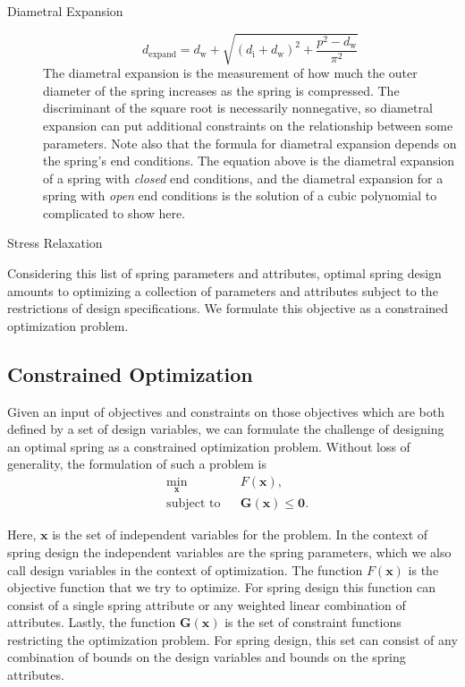 \documentclass[10pt]{article}
\begin{document}
\begin{description}
			\item[Diametral Expansion]\begin{equation} d_{\text{expand}} = d_{\text{w}} + \sqrt{(d_{\text{i}} + d_{\text{w}})^{2} + \frac{p^{2} - d_{\text{w}}}{\pi^{2}}}
			\end{equation}
				The diametral expansion is the measurement of how much the outer diameter of the spring increases as the spring is compressed. The discriminant of the square root is necessarily nonnegative, so diametral expansion can put additional constraints on the relationship between some parameters. Note also that the formula for diametral expansion depends on the spring's end conditions. The equation above is the diametral expansion of a spring with \textit{closed} end conditions, and the diametral expansion for a spring with \textit{open} end conditions is the solution of a cubic polynomial to complicated to show here.
						
			\item[Stress Relaxation]
						
			\end{description}
			
Considering this list of spring parameters and attributes, optimal spring design amounts to optimizing a collection of parameters and attributes subject to the restrictions of design specifications. We formulate this objective as a constrained optimization problem.

\subsection{Constrained Optimization}
\label{sec:Constrained_Optimization}

Given an input of objectives and constraints on those objectives which are both defined by a set of design variables, we can formulate the challenge of designing an optimal spring as a constrained optimization problem. Without loss of generality, the formulation of such a problem is
				\begin{equation*}
 					\begin{aligned}
 						& \underset{\mathbf{x}}{\text{min}}
 						& & F(\mathbf{x}), \\
 						& \text{subject to}
 						& & \mathbf{G}(\mathbf{x}) \le \mathbf{0}.
 					\end{aligned}
				\end{equation*}
				
Here, $\mathbf{x}$ is the set of independent variables for the problem. In the context of spring design the independent variables are the spring parameters, which we also call design variables in the context of optimization. The function $F(\mathbf{x})$ is the objective function that we try to optimize. For spring design this function can consist of a single spring attribute or any weighted linear combination of attributes. Lastly, the function $\mathbf{G}(\mathbf{x})$ is the set of constraint functions restricting the optimization problem. For spring design, this set can consist of any combination of bounds on the design variables and bounds on the spring attributes. 
\end{document}
